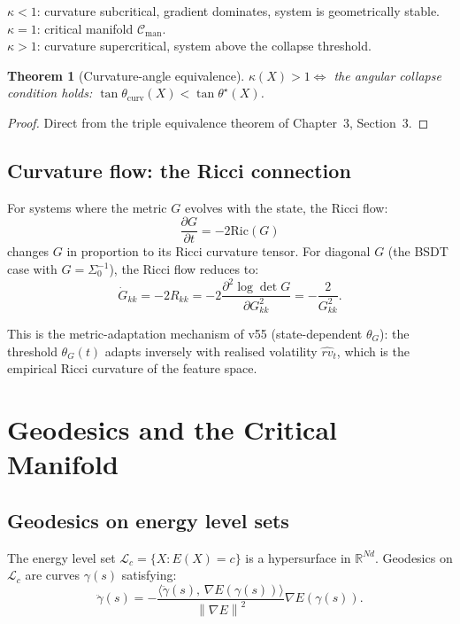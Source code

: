 \documentclass[11pt,a4paper,openany]{book}
\newtheorem{theorem}{Theorem}[chapter]
\theoremstyle{definition}
\newcommand{\R}{\mathbb{R}}
\newcommand{\norm}[1]{\left\|#1\right\|}
\newcommand{\inner}[2]{\langle #1,\,#2\rangle}
\begin{document}
$\kappa < 1$: curvature subcritical, gradient dominates, system is geometrically stable.\\
$\kappa = 1$: critical manifold $\mathcal{C}_\mathrm{man}$.\\
$\kappa > 1$: curvature supercritical, system above the collapse threshold.

\begin{theorem}[Curvature-angle equivalence]
$\kappa(X) > 1 \iff$ the angular collapse condition holds: $\tan\theta_\mathrm{curv}(X) < \tan\theta^\star(X)$.
\end{theorem}

\begin{proof}
Direct from the triple equivalence theorem of Chapter~3, Section~3.
\end{proof}

\section{Curvature flow: the Ricci connection}

For systems where the metric $G$ evolves with the state, the Ricci flow:
\[
\frac{\partial G}{\partial t} = -2\mathrm{Ric}(G)
\]
changes $G$ in proportion to its Ricci curvature tensor. For diagonal $G$ (the BSDT case
with $G = \Sigma_0^{-1}$), the Ricci flow reduces to:
\[
\dot G_{kk} = -2R_{kk} = -2\frac{\partial^2 \log\det G}{\partial G_{kk}^2}
= -\frac{2}{G_{kk}^2}.
\]

This is the metric-adaptation mechanism of v55 (state-dependent $\theta_G$):
the threshold $\theta_G(t)$ adapts inversely with realised volatility $\hat{rv}_t$,
which is the empirical Ricci curvature of the feature space.

\chapter{Geodesics and the Critical Manifold}

\section{Geodesics on energy level sets}

The energy level set $\mathcal{L}_c = \{X : E(X) = c\}$ is a hypersurface in $\R^{Nd}$.
Geodesics on $\mathcal{L}_c$ are curves $\gamma(s)$ satisfying:
\[
\ddot\gamma(s) = -\frac{\inner{\ddot\gamma(s)}{\nabla E(\gamma(s))}}{\norm{\nabla E}^2}\nabla E(\gamma(s)).
\]
\end{document}
